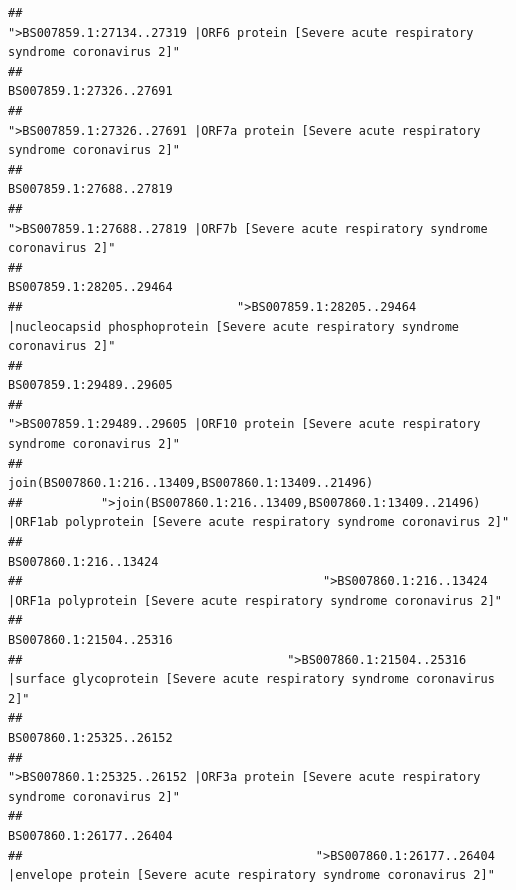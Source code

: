 \documentclass[
]{article}
\begin{document}
\begin{verbatim}
##                                             ">BS007859.1:27134..27319 |ORF6 protein [Severe acute respiratory syndrome coronavirus 2]" 
##                                                                                                                BS007859.1:27326..27691 
##                                            ">BS007859.1:27326..27691 |ORF7a protein [Severe acute respiratory syndrome coronavirus 2]" 
##                                                                                                                BS007859.1:27688..27819 
##                                                    ">BS007859.1:27688..27819 |ORF7b [Severe acute respiratory syndrome coronavirus 2]" 
##                                                                                                                BS007859.1:28205..29464 
##                              ">BS007859.1:28205..29464 |nucleocapsid phosphoprotein [Severe acute respiratory syndrome coronavirus 2]" 
##                                                                                                                BS007859.1:29489..29605 
##                                            ">BS007859.1:29489..29605 |ORF10 protein [Severe acute respiratory syndrome coronavirus 2]" 
##                                                                                    join(BS007860.1:216..13409,BS007860.1:13409..21496) 
##           ">join(BS007860.1:216..13409,BS007860.1:13409..21496) |ORF1ab polyprotein [Severe acute respiratory syndrome coronavirus 2]" 
##                                                                                                                  BS007860.1:216..13424 
##                                          ">BS007860.1:216..13424 |ORF1a polyprotein [Severe acute respiratory syndrome coronavirus 2]" 
##                                                                                                                BS007860.1:21504..25316 
##                                     ">BS007860.1:21504..25316 |surface glycoprotein [Severe acute respiratory syndrome coronavirus 2]" 
##                                                                                                                BS007860.1:25325..26152 
##                                            ">BS007860.1:25325..26152 |ORF3a protein [Severe acute respiratory syndrome coronavirus 2]" 
##                                                                                                                BS007860.1:26177..26404 
##                                         ">BS007860.1:26177..26404 |envelope protein [Severe acute respiratory syndrome coronavirus 2]" 

\end{verbatim}
\end{document}
